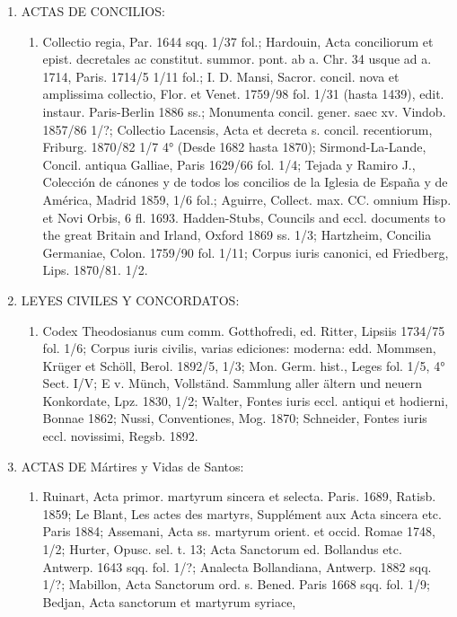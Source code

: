 \raggedbottom{} \documentclass[12pt, a4paper]{book}
\begin{document}
\begin{enumerate}
\begin{enumerate}
        \end{enumerate}
  \item ACTAS DE CONCILIOS:\@  \begin{enumerate}
          \item Collectio regia, Par. 1644 sqq. 1/37 fol.; Hardouin, Acta conciliorum et epist. decretales ac constitut. summor. pont. ab a. Chr. 34 usque ad a. 1714, Paris. 1714/5 1/11 fol.; I. D. Mansi, Sacror. concil. nova et amplissima collectio, Flor. et Venet. 1759/98 fol. 1/31 (hasta 1439), edit. instaur. Paris-Berlin 1886 ss.; Monumenta concil. gener. saec xv. Vindob. 1857/86 1/?; Collectio Lacensis, Acta et decreta s. concil. recentiorum, Friburg. 1870/82 1/7 4° (Desde 1682 hasta 1870); Sirmond-La-Lande, Concil. antiqua Galliae, Paris 1629/66 fol. 1/4; Tejada y Ramiro J., Colección de cánones y de todos los concilios de la Iglesia de España y de América, Madrid 1859, 1/6 fol.; Aguirre, Collect. max. CC. omnium Hisp. et Novi Orbis, 6 fl. 1693. Hadden-Stubs, Councils and eccl. documents to the great Britain and Irland, Oxford 1869 ss. 1/3; Hartzheim, Concilia Germaniae, Colon. 1759/90 fol. 1/11; Corpus iuris canonici, ed Friedberg, Lips. 1870/81. 1/2.
        \end{enumerate}
  \item LEYES CIVILES Y CONCORDATOS:  \begin{enumerate}
          \item Codex Theodosianus cum comm. Gotthofredi, ed. Ritter, Lipsiis 1734/75 fol. 1/6; Corpus iuris civilis, varias ediciones: moderna: edd. Mommsen, Krüger et Schöll, Berol. 1892/5, 1/3; Mon. Germ. hist., Leges fol. 1/5, 4° Sect. I/V; E v. Münch, Vollständ. Sammlung aller ältern und neuern Konkordate, Lpz. 1830, 1/2; Walter, Fontes iuris eccl. antiqui et hodierni, Bonnae 1862; Nussi, Conventiones, Mog. 1870; Schneider, Fontes iuris eccl. novissimi, Regsb. 1892.
        \end{enumerate}
  \item ACTAS DE Mártires y Vidas de Santos:  \begin{enumerate}
          \item Ruinart, Acta primor. martyrum sincera et selecta. Paris. 1689, Ratisb. 1859; Le Blant, Les actes
                des martyrs, Supplément aux Acta sincera etc. Paris 1884; Assemani, Acta
                ss. martyrum orient. et occid. Romae 1748, 1/2; Hurter, Opusc. sel. t. 13;
                Acta Sanctorum ed. Bollandus etc. Antwerp. 1643 sqq. fol. 1/?; Analecta
                Bollandiana, Antwerp. 1882 sqq. 1/?; Mabillon, Acta Sanctorum ord. s. Bened. Paris 1668 sqq. fol. 1/9; Bedjan, Acta sanctorum et martyrum syriace,

\end{enumerate}
\end{enumerate}
\end{document}
